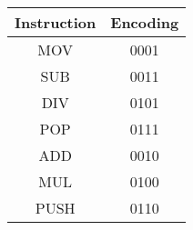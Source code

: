 \begin{tabular}{|c|c|}
    \hline
    \textbf{Instruction} & \textbf{Encoding} \\
    \hline
    MOV                  & 0001              \\
    SUB                  & 0011              \\
    DIV                  & 0101              \\
    POP                  & 0111              \\
    ADD                  & 0010              \\
    MUL                  & 0100              \\
    PUSH                 & 0110              \\
    \hline
\end{tabular}
